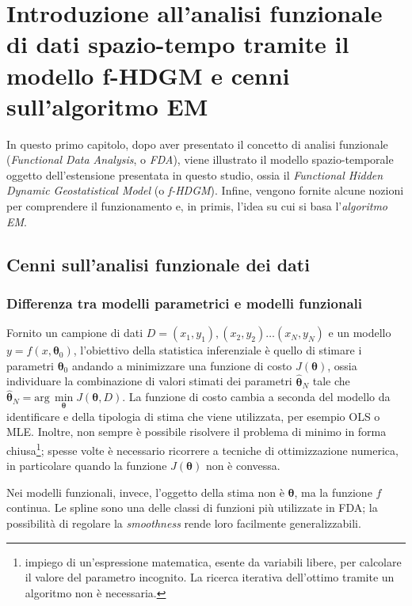 \chapter[Il modello f-HDGM e l'algoritmo EM]{Introduzione all'analisi funzionale di dati spazio-tempo tramite il modello f-HDGM e cenni sull'algoritmo EM}

In questo primo capitolo, dopo aver presentato il concetto di analisi funzionale (\textit{Functional Data Analysis}, o \textit{FDA}), viene illustrato il modello spazio-temporale oggetto dell'estensione presentata in questo studio, ossia il \textit{Functional Hidden Dynamic Geostatistical Model} (o \textit{f-HDGM}). Infine, vengono fornite alcune nozioni per comprendere il funzionamento e, in primis, l'idea su cui si basa l'\textit{algoritmo EM}.

\section[Cenni sull'analisi funzionale dei dati]{Cenni sull'analisi funzionale dei dati}

\subsection[Differenza tra modelli parametrici e modelli funzionali]{Differenza tra modelli parametrici e modelli funzionali}
Fornito un campione di dati $D = (x_1, y_1), (x_2, y_2)\dots (x_N, y_N)$ e un modello $y = f(x, \boldsymbol{\theta}_0)$, l'obiettivo della statistica inferenziale è quello di stimare i parametri $\boldsymbol{\theta}_0$ andando a minimizzare una funzione di costo $J(\boldsymbol{\theta})$, ossia individuare la combinazione di valori stimati dei parametri $\boldsymbol{\hat{\theta}}_N$ tale che $\boldsymbol{\hat{\theta}}_N = \text{arg}\,\min\limits_{\boldsymbol{\theta}} J(\boldsymbol{\theta}, D)$. La funzione di costo cambia a seconda del modello da identificare e della tipologia di stima che viene utilizzata, per esempio OLS o MLE. Inoltre, non sempre è possibile risolvere il problema di minimo in forma chiusa\footnote{impiego di un'espressione matematica, esente da variabili libere, per calcolare il valore del parametro incognito. La ricerca iterativa dell'ottimo tramite un algoritmo non è necessaria.}; spesse volte è necessario ricorrere a tecniche di ottimizzazione numerica, in particolare quando la funzione $J(\boldsymbol{\theta})$ non è convessa. \par Nei modelli funzionali, invece, l'oggetto della stima non è $\boldsymbol{\theta}$, ma la funzione $f$ continua. Le spline sono una delle classi di funzioni più utilizzate in FDA; la possibilità di regolare  la \textit{smoothness} rende loro facilmente generalizzabili.


